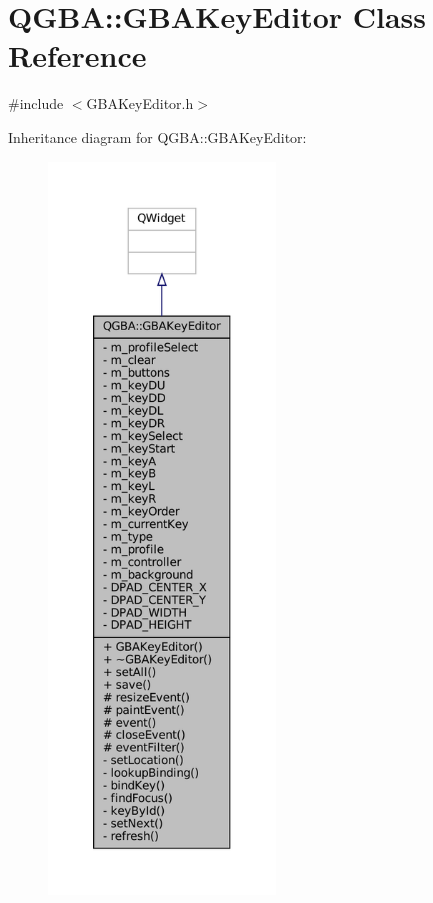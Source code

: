 \hypertarget{class_q_g_b_a_1_1_g_b_a_key_editor}{}\section{Q\+G\+BA\+:\+:G\+B\+A\+Key\+Editor Class Reference}
\label{class_q_g_b_a_1_1_g_b_a_key_editor}


{\ttfamily \#include $<$G\+B\+A\+Key\+Editor.\+h$>$}



Inheritance diagram for Q\+G\+BA\+:\+:G\+B\+A\+Key\+Editor\+:
\nopagebreak
\begin{figure}[H]
\begin{center}
\leavevmode
\includegraphics[height=550pt]{class_q_g_b_a_1_1_g_b_a_key_editor__inherit__graph}
\end{center}
\end{figure}


